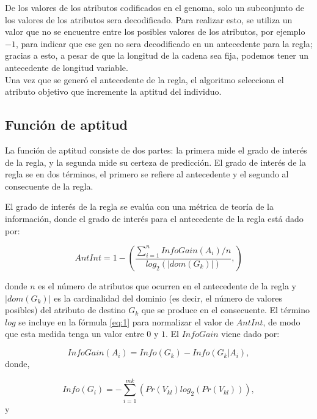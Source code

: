 De los valores de los atributos codificados en el genoma, solo un subconjunto de los valores de los atributos sera decodificado. Para realizar esto, se utiliza un valor que no se encuentre entre los posibles valores de los atributos, por ejemplo $-1$, para indicar que ese gen no sera decodificado en un antecedente para la regla; gracias a esto, a pesar de que la longitud de la cadena sea fija, podemos tener un antecedente de longitud variable.
\\
Una vez que se generó el antecedente de la regla, el algoritmo selecciona el atributo objetivo que incremente la aptitud del individuo.

\subsection{Función de aptitud}

La función de aptitud consiste de dos partes: la primera mide el grado de interés de la regla, y la segunda mide su certeza de predicción. El grado de interés de la regla se en dos términos, el primero se refiere al antecedente y el segundo al consecuente de la regla.

El grado de interés de la regla se evalúa con una métrica de teoría de la información, donde el grado de interés para el antecedente de la regla está dado por:

\begin{equation} 
\label{eq:1}
AntInt = 1- \left( \frac{\sum\limits_{i=1}^n InfoGain(A_i)/n}
{log_2(\left| dom(G_k) \right|)},
\right)
\end{equation}

\noindent
donde $n$ es el número de atributos que ocurren en el antecedente de la regla y $|dom(G_k)|$ es la cardinalidad del dominio (es decir, el número de valores posibles) del atributo de destino $G_k$ que se produce en el consecuente. El término $log$ se incluye en la fórmula \ref{eq:1} para normalizar el valor de $AntInt$, de modo que esta medida tenga un valor entre $0$ y $1$. El $InfoGain$ viene dado por:

\begin{equation} \label{eq:2}
InfoGain(A_i)=Info(G_k)-Info(\left.G_k\right| A_i),
\end{equation}
donde,

\begin{equation}  \label{eq:3}
Info(G_i)=-\sum\limits_{i=1}^{mk}\left(Pr(V_{kl}) log_2 (Pr(V_{kl}))\right),
\end{equation}
y

